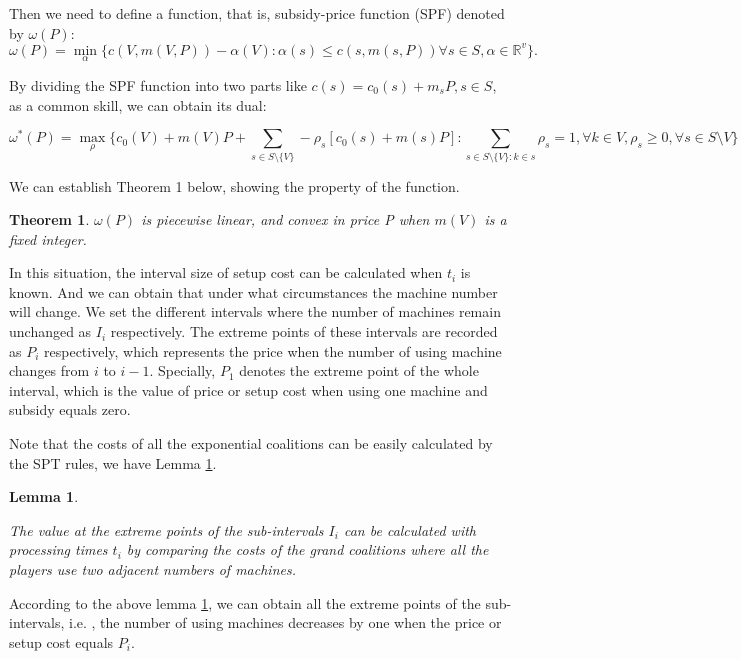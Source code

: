 \documentclass[UTF8]{article}
\newtheorem{thm}{\hspace{2em}Theorem}
\newtheorem{lem}{\hspace{2em}Lemma}
\begin{document}
Then we need to define a function, that is, subsidy-price function (SPF) denoted by $\omega(P)$:
\[
  {\omega(P)}=\mathop{\min}_{\alpha}\{c(V,m(V,P))-\alpha(V): \alpha(s)\leq c(s,m(s,P))
 \forall s \in S, \alpha\in\mathbb{R}^{v}\}.
\]

By dividing the SPF function into two parts like $c(s)=c_0(s)+m_sP, s \in S$, as a common skill, we can obtain its dual:

\begin{equation}\label{dual}
 {\omega^*(P)}=\mathop{\max}_{\rho} \{c_0(V)+m(V)P+\sum_{s\in S\setminus\{V\}}-\rho_s[c_0(s)+m(s)P]:
 \sum_{s\in S\setminus\{V\}:k\in s}\rho_s=1,\forall k \in V,\rho_s\geq 0,\forall s \in S \setminus{V}\}
\end{equation}

We can establish Theorem 1 below, showing the property of the function.

\begin{thm}\label{thm1}
$\omega(P)$ is piecewise linear, and convex in price P when $m(V)$ is a fixed integer.
\end{thm}


In this situation, the interval size of setup cost can be calculated when $t_i$ is known. And we can obtain that under what circumstances the machine number will change. We set the different intervals where the number of machines remain unchanged as $I_i$ respectively. The extreme points of these intervals are recorded as $P_i$ respectively, which represents the price when the number of using machine changes from $i$ to $i-1$. Specially, $P_1$ denotes the extreme point of the whole interval, which is the value of price or setup cost when using one machine and subsidy equals zero.

Note that the costs of all the exponential coalitions can be easily calculated by the SPT rules, we have Lemma \ref{lem1}.

\begin{lem}\label{lem1}

The value at the extreme points of the sub-intervals $I_i$ can be calculated with processing times $t_i$ by comparing the costs of the grand coalitions where all the players use two adjacent numbers of machines.
\end{lem}

According to the above lemma \ref{lem1}, we can obtain all the extreme points of the sub-intervals, i.e. , the number of using machines decreases by one when the price or setup cost equals $P_i$.
\end{document}
